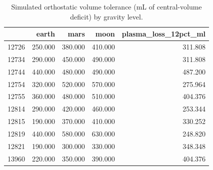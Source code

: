 \begin{table}
\caption{Simulated orthostatic volume tolerance (mL of central-volume deficit) by gravity level.}
\label{tab:gravity_volume_tolerance}
\begin{tabular}{lrrrr}
\toprule
 & earth & mars & moon & plasma_loss_12pct_ml \\
\midrule
12726 & 250.000 & 380.000 & 410.000 & 311.808 \\
12734 & 290.000 & 450.000 & 490.000 & 311.808 \\
12744 & 440.000 & 480.000 & 490.000 & 487.200 \\
12754 & 320.000 & 520.000 & 570.000 & 275.964 \\
12755 & 360.000 & 480.000 & 510.000 & 404.376 \\
12814 & 290.000 & 420.000 & 460.000 & 253.344 \\
12815 & 190.000 & 370.000 & 410.000 & 330.252 \\
12819 & 440.000 & 580.000 & 630.000 & 248.820 \\
12821 & 190.000 & 300.000 & 330.000 & 348.348 \\
13960 & 220.000 & 350.000 & 390.000 & 404.376 \\
\bottomrule
\end{tabular}
\end{table}
